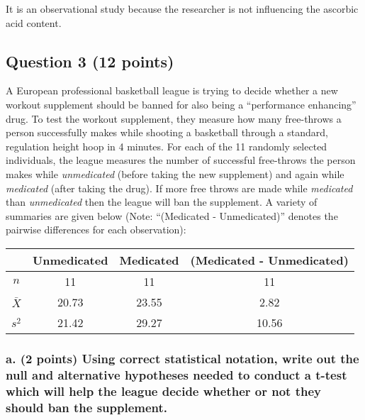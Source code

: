 \documentclass[
]{article}
\begin{document}
It is an observational study because the researcher is not influencing
the ascorbic acid content.

\newpage

\hypertarget{question-3-12-points}{%
\subsection{Question 3 (12 points)}\label{question-3-12-points}}

A European professional basketball league is trying to decide whether a
new workout supplement should be banned for also being a ``performance
enhancing'' drug. To test the workout supplement, they measure how many
free-throws a person successfully makes while shooting a basketball
through a standard, regulation height hoop in 4 minutes. For each of the
11 randomly selected individuals, the league measures the number of
successful free-throws the person makes while \emph{unmedicated} (before
taking the new supplement) and again while \emph{medicated} (after
taking the drug). If more free throws are made while \emph{medicated}
than \emph{unmedicated} then the league will ban the supplement. A
variety of summaries are given below (Note: ``(Medicated -
Unmedicated)'' denotes the pairwise differences for each observation):

\begin{longtable}[]{@{}cccc@{}}
\toprule
& Unmedicated & Medicated & (Medicated - Unmedicated) \\
\midrule
\endhead
\(n\) & 11 & 11 & 11 \\
\(\bar{X}\) & 20.73 & 23.55 & 2.82 \\
\(s^2\) & 21.42 & 29.27 & 10.56 \\
\bottomrule
\end{longtable}

\hypertarget{a.-2-points-using-correct-statistical-notation-write-out-the-null-and-alternative-hypotheses-needed-to-conduct-a-t-test-which-will-help-the-league-decide-whether-or-not-they-should-ban-the-supplement.}{%
\subsubsection{a. (2 points) Using correct statistical notation, write
out the null and alternative hypotheses needed to conduct a t-test which
will help the league decide whether or not they should ban the
supplement.}\label{a.-2-points-using-correct-statistical-notation-write-out-the-null-and-alternative-hypotheses-needed-to-conduct-a-t-test-which-will-help-the-league-decide-whether-or-not-they-should-ban-the-supplement.}}
\end{document}
